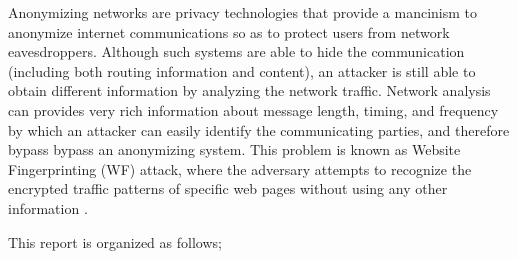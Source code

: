 Anonymizing networks are privacy technologies that provide a mancinism to anonymize internet communications so as to protect users from network eavesdroppers. Although such systems are able to hide the communication (including both routing information and content), an attacker is still able to obtain different information by analyzing the network traffic. Network analysis can provides very rich information about message length, timing, and frequency by which an attacker can easily identify the communicating parties, and therefore bypass bypass an anonymizing system. This problem is known as Website Fingerprinting (WF) attack, where the adversary attempts to recognize the encrypted traffic patterns of specific web pages without using any other information \cite{juarez14, murdoch2005low}.



This report is organized as follows; %
 
